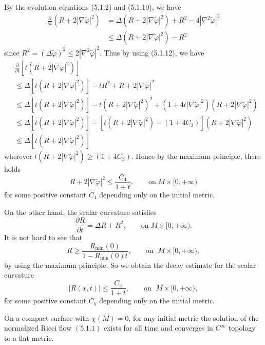 By the evolution equations (5.1.2) and (5.1.10), we have
\begin{align*}
\frac{\partial }{\partial t}(R+2|\nabla\tilde{\varphi}|^2) &
=\Delta(R+2|\nabla\tilde{\varphi}|^2)
+R^2-4|\nabla^2\tilde{\varphi}|^2\\
&  \le \Delta(R+2|\nabla\tilde{\varphi}|^2)-R^2
\end{align*}
since $R^2=(\Delta\tilde{\varphi})^2\le
2|\nabla^2\tilde{\varphi}|^2$. Thus by using (5.1.12), we have
\begin{align*}
& \frac{\partial }{\partial
t}[t(R+2|\nabla\tilde{\varphi}|^2)]\\
&  \le \Delta[t(R+2|\nabla\tilde{\varphi}|^2)]
-tR^2+R+2|\nabla\tilde{\varphi}|^2\\
& \leq\Delta[t(R+2|\nabla\tilde{\varphi}|^2)]
-t(R+2|\nabla\tilde{\varphi}|^2)^2+(1+4t|\nabla
\tilde{\varphi}|^2)(R+2|\nabla\tilde{\varphi}|^2)\\
&  \le \Delta[t(R+2|\nabla\tilde{\varphi}|^2)]
-[t(R+2|\nabla\tilde{\varphi}|^2)
-(1+4C_3)](R+2|\nabla\tilde{\varphi}|^2)\\
&  \le \Delta[t(R+2|\nabla\tilde{\varphi}|^2)]
\end{align*}
wherever $t(R+2|\nabla\tilde{\varphi}|^2)\ge (1+4C_3)$. Hence by
the maximum principle, there holds \begin{equation}
R+2|\nabla\tilde{\varphi}|^2\le\frac{C_4}{1+t},\qquad
\text{on}\;M\times[0,+\infty)  %
\end{equation} for some positive constant $C_4$ depending only on the initial
metric.

On the other hand, the scalar curvature satisfies
$$
\frac{\partial R}{\partial t} =\Delta R+R^2,\qquad \text{on
}\;M\times[0,+\infty).
$$
It is not hard to see that \begin{equation}
R\ge\frac{R_{\min}(0)}{1-R_{\min}(0)t},\qquad
\text{on }\;M\times[0,+\infty),  %
\end{equation} by using the maximum principle. So we obtain the decay
estimate for the scalar curvature \begin{equation}
|R(x,t)|\le\frac{C_5}{1+t},\qquad \text{on }\;M\times[0,+\infty),
\end{equation} for some positive constant $C_5$ depending only on the initial
metric.

\begin{theorem}
  \label{thm:cz-zero-euler-surface-convergence}

On a compact surface with $\chi(M)=0$, for any initial metric the
solution of the normalized Ricci flow $(5.1.1)$ exists for all
time and converges in $C^\infty$ topology to a flat metric.
\end{theorem}

